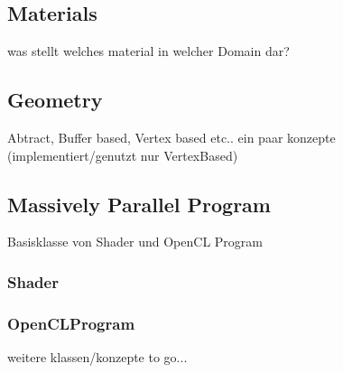 \subsection{Materials}  
	was stellt welches material in welcher Domain dar?
	
\subsection{Geometry}
	Abtract, Buffer based, Vertex based etc.. ein paar konzepte (implementiert/genutzt nur VertexBased)  
	
\subsection{Massively Parallel Program}
	Basisklasse von Shader und OpenCL Program
	\subsubsection{Shader}
		
	\subsubsection{OpenCLProgram}

weitere klassen/konzepte to go...	
	  	
  	

\clearpage
